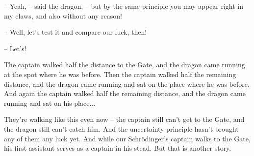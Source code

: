 \documentclass[ebook,oneside,final,openright]{memoir}
\begin{document}
– Yeah, – said the dragon, – but by the same principle you may appear right in my claws, and also without any reason!\par
– Well, let’s test it and compare our luck, then!\par
– Let’s!\par
\par
The captain walked half the distance to the Gate, and the dragon came running at the spot where he was before. Then the captain walked half the remaining distance, and the dragon came running and sat on the place where he was before. And again the captain walked half the remaining distance, and the dragon came running and sat on his place...\par
\par
They’re walking like this even now – the captain still can’t get to the Gate, and the dragon still can’t catch him. And the uncertainty principle hasn’t brought any of them any luck yet. And while our Schrödinger’s captain walks to the Gate, his first assistant serves as a captain in his stead. But that is another story.
\end{document}
